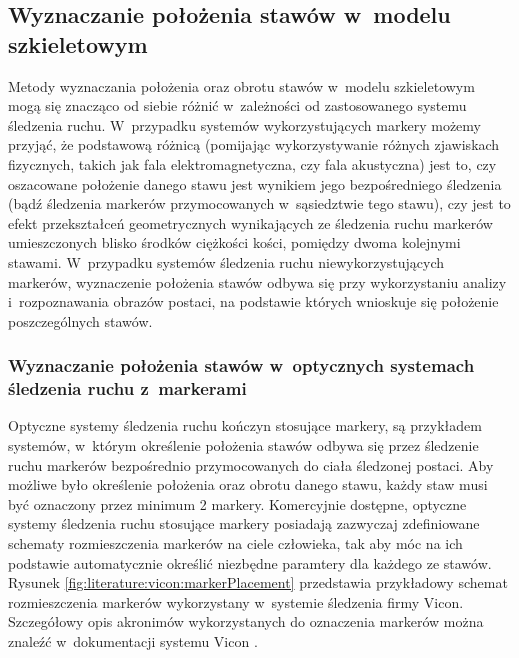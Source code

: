 
																	
\subsection{Wyznaczanie położenia stawów w~modelu szkieletowym}
Metody wyznaczania położenia oraz obrotu stawów w~modelu szkieletowym mogą się znacząco od siebie różnić w~zależności od zastosowanego systemu śledzenia ruchu. W~przypadku systemów wykorzystujących markery możemy przyjąć, że podstawową różnicą (pomijając wykorzystywanie różnych zjawiskach fizycznych, takich jak fala elektromagnetyczna, czy fala akustyczna) jest to, czy oszacowane położenie danego stawu jest wynikiem jego bezpośredniego śledzenia (bądź śledzenia markerów przymocowanych w~sąsiedztwie tego stawu), czy jest to efekt przekształceń geometrycznych wynikających ze śledzenia ruchu markerów umieszczonych blisko środków ciężkości kości, pomiędzy dwoma kolejnymi stawami. W~przypadku systemów śledzenia ruchu niewykorzystujących markerów, wyznaczenie położenia stawów odbywa się przy wykorzystaniu analizy i~rozpoznawania obrazów postaci, na podstawie których wnioskuje się położenie poszczególnych stawów.
																	
\subsubsection*{Wyznaczanie położenia stawów w~optycznych systemach śledzenia ruchu z~markerami}
Optyczne systemy śledzenia ruchu kończyn stosujące markery, są przykładem systemów, w~którym określenie położenia stawów odbywa się przez śledzenie ruchu markerów bezpośrednio przymocowanych do ciała śledzonej postaci. Aby możliwe było określenie położenia oraz obrotu danego stawu, każdy staw musi być oznaczony przez minimum 2 markery. Komercyjnie dostępne, optyczne systemy śledzenia ruchu stosujące markery posiadają zazwyczaj zdefiniowane schematy rozmieszczenia markerów na ciele człowieka, tak aby móc na ich podstawie automatycznie określić niezbędne paramtery dla każdego ze stawów. Rysunek \ref{fig:literature:vicon:markerPlacement} przedstawia przykładowy schemat rozmieszczenia markerów wykorzystany w~systemie śledzenia firmy Vicon. Szczegółowy opis akronimów wykorzystanych do oznaczenia markerów można znaleźć w~dokumentacji systemu Vicon \cite{ViconGaitPlacement}.
																	
